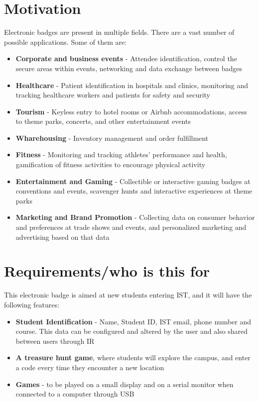 \documentclass[english]{ist-thesis}
\begin{document}
\section{Motivation}

Electronic badges are present in multiple fields. There are a vast number of possible applications. Some of them are:

\begin{itemize}
    \item \textbf{Corporate and business events} - Attendee identification, control the secure areas within events, networking and data exchange between badges 
    \item \textbf{Healthcare} - Patient identification in hospitals and clinics, monitoring and tracking healthcare workers and patients for safety and security
    \item \textbf{Tourism} - Keyless entry to hotel rooms or Airbnb accommodations, access to theme parks, concerts, and other entertainment events
    \item \textbf{Wharehousing} - Inventory management and order fulfillment
    \item \textbf{Fitness} - Monitoring and tracking athletes' performance and health, gamification of fitness activities to encourage physical activity
    \item \textbf{Entertainment and Gaming} - Collectible or interactive gaming badges at conventions and events, scavenger hunts and interactive experiences at theme parks
    \item \textbf{Marketing and Brand Promotion} - Collecting data on consumer behavior and preferences at trade shows and events, and personalized marketing and advertising based on that data
\end{itemize}

\section{Requirements/who is this for}

This electronic badge is aimed at new students entering IST, and it will have the following features:

\begin{itemize}
    \item \textbf{Student Identification} - Name, Student ID, IST email, phone number and course. This data can be configured and altered by the user and also shared between users through IR
    \item \textbf{A treasure hunt game}, where students will explore the campus, and enter a code every time they encounter a new location
    \item \textbf{Games} - to be played on a small display and on a serial monitor when connected to a computer through USB
\end{itemize}
\end{document}
